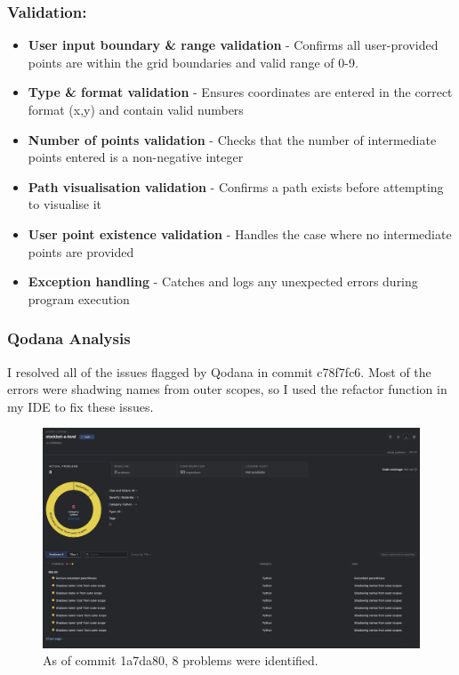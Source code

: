 \subsubsection{Validation:}
\begin{itemize}
    \item \textbf{User input boundary \& range validation} - Confirms all user-provided points are within the grid boundaries and valid range of 0-9.
    \item \textbf{Type \& format validation} - Ensures coordinates are entered in the correct format (x,y) and contain valid numbers
    \item \textbf{Number of points validation} - Checks that the number of intermediate points entered is a non-negative integer
    \item \textbf{Path visualisation validation} - Confirms a path exists before attempting to visualise it
    \item \textbf{User point existence validation} - Handles the case where no intermediate points are provided
    \item \textbf{Exception handling} - Catches and logs any unexpected errors during program execution
\end{itemize}

\subsubsection{Qodana Analysis}
   I resolved all of the issues flagged by Qodana in commit c78f7fc6. Most of the errors were shadwing names from outer scopes, so I used the refactor function in my IDE to fix these issues.

\begin{figure}[htbp!]
    \centering
    \includegraphics[width=0.85\linewidth]{Images/qodana-sa2.png}
    \caption{As of commit 1a7da80, 8 problems were identified.}
\end{figure}

